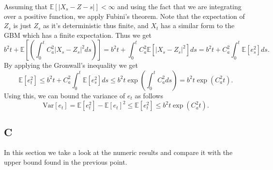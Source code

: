 \documentclass[a4paper,12pt]{article} %
\newcommand{\Var}{\mathrm{Var}}
\begin{document}
Assuming that \(\mathbb{E} \left[ |X_s - Z-s| \right] <\infty \) and using the fact that we are integrating over a positive function, we apply Fubini's theorem. Note that the expectation of \(Z_s\) is just \(Z_s\) as it's deterministic thus finite, and \(X_t\) has a similar form to the GBM which has a finite expectation. Thus we get
\begin{equation}
    b^2 t+ \mathbb{E} \left[  \left( \int _0^t C_{a} ^{2}  \left|X_s - Z_s\right|^{2}  ds \right)  \right] = b^2 t + \int _0^t C_a^2 \mathbb{E} \left[ |X_s - Z_s |^2\right]ds  = b^2 t + C_a^2 \int _0^t \mathbb{E} \left[ e_s^2 \right]ds.
\end{equation}
By applying the Gronwall's inequality we get
\begin{equation}
    \mathbb{E} \left[ e_t^2 \right]\leq b^2 t + C_a^2 \int _0^t \mathbb{E} \left[ e_s^2 \right]ds \leq b^2 t \exp \left( \int _0^t C_{a}^{2} ds  \right) =  b^2 t \exp \left(   C_a^2 t  \right).
\end{equation}
Using this, we can bound the variance of \(e_t\) as follows
\begin{equation}
    \Var\left[e_t \right] = \mathbb{E} \left[ e_t^2 \right] - \mathbb{E} \left[ e_t \right]^{2} \leq \mathbb{E} \left[ e_t^2 \right]\leq  b^2 t \exp \left(   C_a^2 t  \right).
\end{equation}

\subsection{C}
In this section we take a look at the numeric results and compare it with the upper bound found in the previous point.
\end{document}
